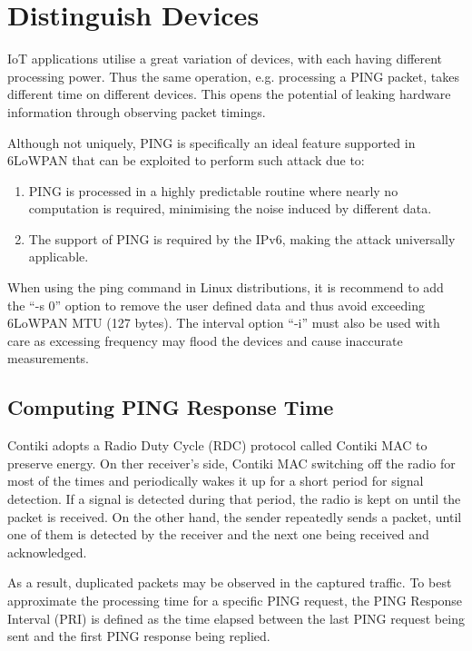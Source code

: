 \section{Distinguish Devices}
IoT applications utilise a great variation of devices, with each having different processing power. Thus the same operation, e.g. processing a PING packet, takes different time on different devices. This opens the potential of leaking hardware information through observing packet timings.

Although not uniquely, PING is specifically an ideal feature supported in 6LoWPAN that can be exploited to perform such attack due to:
\begin{enumerate}
	\item PING is processed in a highly predictable routine where nearly no computation is required, minimising the noise induced by different data.
	\item The support of PING is required by the IPv6\cite{rfc4443}, making the attack universally applicable.
\end{enumerate}

When using the ping command in Linux distributions, it is recommend to add the ``-s 0'' option to remove the user defined data and thus avoid exceeding 6LoWPAN MTU (127 bytes). The interval option  ``-i'' must also be used with care as excessing frequency may flood the devices and cause inaccurate measurements.

\subsection{Computing PING Response Time}\label{TimingWithContikiMAC}
Contiki adopts a Radio Duty Cycle (RDC) protocol called Contiki MAC\cite{ContikiMAC} to preserve energy. On ther receiver's side, Contiki MAC switching off the radio for most of the times and periodically wakes it up for a short period for signal detection. If a signal is detected during that period, the radio is kept on until the packet is received. On the other hand, the sender repeatedly sends a packet, until one of them is detected by the receiver and the next one being received and acknowledged.

As a result, duplicated packets may be observed in the captured traffic. To best approximate the processing time for a specific PING request, the PING Response Interval (PRI) is defined as the time elapsed between the last PING request being sent and the first PING response being replied. 

